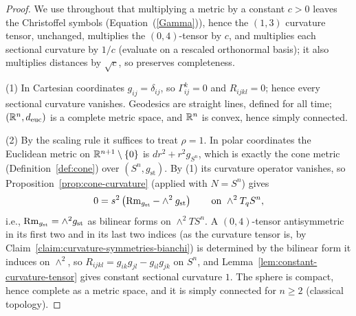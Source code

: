 \begin{proof}
\sketch
{}
We use throughout that multiplying a metric by a constant $c>0$
leaves the Christoffel symbols (Equation~(\ref{Gamma})), hence the
$(1,3)$ curvature tensor, unchanged, multiplies the $(0,4)$-tensor
by $c$, and multiplies each sectional curvature by $1/c$
(evaluate on a rescaled orthonormal basis); it also multiplies
distances by $\sqrt c$, so preserves completeness.

(1) In Cartesian coordinates $g_{ij}=\delta_{ij}$, so
$\Gamma^k_{ij}=0$ and $R_{ijkl}=0$; hence every sectional
curvature vanishes. Geodesics are straight lines, defined for all
time; $(\mathbb{R}^n,d_{\mathrm{euc}})$ is a complete metric space, and
$\mathbb{R}^n$ is convex, hence simply connected.

(2) By the scaling rule it suffices to treat $\rho=1$. In polar
coordinates the Euclidean metric on $\mathbb{R}^{n+1}\setminus\{0\}$ is
$dr^2+r^2g_{S^n}$, which is exactly the cone metric
(Definition~\ref{def:cone}) over $(S^n,g_{\mathrm{st}})$. By (1)
its curvature operator vanishes, so
Proposition~\ref{prop:cone-curvature} (applied with $N=S^n$) gives
$$0=s^2\left(\operatorname{Rm}_{g_{\mathrm{st}}}-\wedge^2g_{\mathrm{st}}\right)
\qquad\text{on }\wedge^2T_qS^n,$$
i.e., $\operatorname{Rm}_{g_{\mathrm{st}}}=\wedge^2g_{\mathrm{st}}$ as bilinear
forms on $\wedge^2TS^n$. A $(0,4)$-tensor antisymmetric in its
first two and in its last two indices (as the curvature tensor is,
by Claim~\ref{claim:curvature-symmetries-bianchi}) is determined by
the bilinear form it induces on $\wedge^2$, so
$R_{ijkl}=g_{ik}g_{jl}-g_{il}g_{jk}$ on $S^n$, and
Lemma~\ref{lem:constant-curvature-tensor} gives constant sectional
curvature $1$. The sphere is compact, hence complete as a metric
space, and it is simply connected for $n\ge2$ (classical
topology).


\end{proof}
